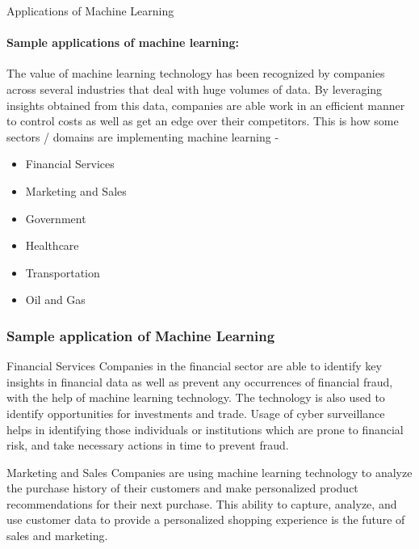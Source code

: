 \documentclass[8pt]{beamer}
\begin{document}
\begin{frame}{Applications of Machine Learning}
  \framesubtitle{Sample applications of machine learning:}
  The value of machine learning technology has been recognized by companies across several industries that deal with huge volumes of data. By leveraging insights obtained from this data, companies are able work in an efficient manner to control costs as well as get an edge over their competitors. This is how some sectors / domains are implementing machine learning -
  \begin{itemize}
      \item Financial Services
      \item Marketing and Sales
      \item Government
      \item Healthcare
      \item Transportation
      \item Oil and Gas
  \end{itemize}

\end{frame}
\begin{frame}
\frametitle{Sample application of Machine Learning}

\begin{block}{Financial Services}
Companies in the financial sector are able to identify key insights in financial data as well as prevent any occurrences of financial fraud, with the help of machine learning technology. The technology is also used to identify opportunities for investments and trade. Usage of cyber surveillance helps in identifying those individuals or institutions which are prone to financial risk, and take necessary actions in time to prevent fraud.
\end{block}

\begin{block}{Marketing and Sales}
Companies are using machine learning technology to analyze the purchase history of their customers and make personalized product recommendations for their next purchase. This ability to capture, analyze, and use customer data to provide a personalized shopping experience is the future of sales and marketing.
\end{block}
\end{frame}
\end{document}
